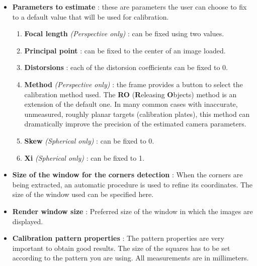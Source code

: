\documentclass{article}
\begin{document}
\begin{itemize}
    \item \textbf{Parameters to estimate} : these are parameters the user can choose to fix to a default value that will be used for calibration.
    
    \begin{enumerate}
        \item \textbf{Focal length} \textit{(Perspective only)} : can be fixed using two values.
        \item \textbf{Principal point} : can be fixed to the center of an image loaded.
        \item \textbf{Distorsions} : each of the distorsion coefficients can be fixed to 0.
        \item \textbf{Method} \textit{(Perspective only)} : the frame provides a button to select the calibration method used. The \textbf{RO} (\textbf{R}eleasing \textbf{O}bjects) method is an extension of the default one. In many common cases with inaccurate, unmeasured, roughly planar targets (calibration plates), this method can dramatically improve the precision of the estimated camera parameters.
        \item \textbf{Skew} \textit{(Spherical only)} : can be fixed to 0.
        \item \textbf{Xi} \textit{(Spherical only)} : can be fixed to 1.
    \end{enumerate}
    
    \item \textbf{Size of the window for the corners detection} : When the corners are being extracted, an automatic procedure is used to refine its coordinates. The size of the window used can be specified here.
    
    \item \textbf{Render window size} : Preferred size of the window in which the images are displayed.
    
    \item \textbf{Calibration pattern properties} : The pattern properties are very important to obtain
    good results. The size of the squares has to be set according to the pattern you are using. All
    measurements are in millimeters.
\end{itemize}
\end{document}
